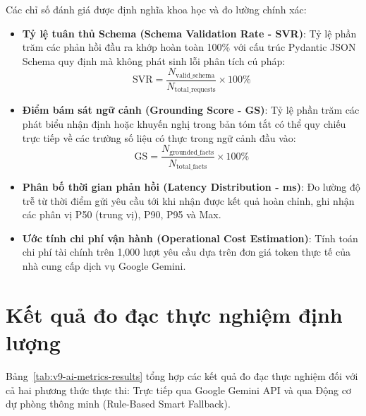 Các chỉ số đánh giá được định nghĩa khoa học và đo lường chính xác:
\begin{itemize}
  \item \textbf{Tỷ lệ tuân thủ Schema (Schema Validation Rate - SVR)}: Tỷ lệ phần trăm các phản hồi đầu ra khớp hoàn toàn 100\% với cấu trúc Pydantic JSON Schema quy định mà không phát sinh lỗi phân tích cú pháp:
    \begin{equation}
      \text{SVR} = \frac{N_{\text{valid\_schema}}}{N_{\text{total\_requests}}} \times 100\%
    \end{equation}
  \item \textbf{Điểm bám sát ngữ cảnh (Grounding Score - GS)}: Tỷ lệ phần trăm các phát biểu nhận định hoặc khuyến nghị trong bản tóm tắt có thể quy chiếu trực tiếp về các trường số liệu có thực trong ngữ cảnh đầu vào:
    \begin{equation}
      \text{GS} = \frac{N_{\text{grounded\_facts}}}{N_{\text{total\_facts}}} \times 100\%
    \end{equation}
  \item \textbf{Phân bố thời gian phản hồi (Latency Distribution - ms)}: Đo lường độ trễ từ thời điểm gửi yêu cầu tới khi nhận được kết quả hoàn chỉnh, ghi nhận các phân vị P50 (trung vị), P90, P95 và Max.
  \item \textbf{Ước tính chi phí vận hành (Operational Cost Estimation)}: Tính toán chi phí tài chính trên 1,000 lượt yêu cầu dựa trên đơn giá token thực tế của nhà cung cấp dịch vụ Google Gemini.
\end{itemize}

\section{Kết quả đo đạc thực nghiệm định lượng}

Bảng~\ref{tab:v9-ai-metrics-results} tổng hợp các kết quả đo đạc thực nghiệm đối với cả hai phương thức thực thi: Trực tiếp qua Google Gemini API và qua Động cơ dự phòng thông minh (Rule-Based Smart Fallback).

